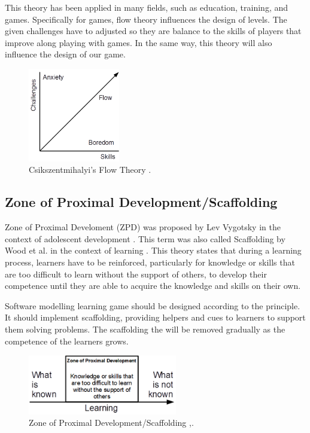 \documentclass[12pt, a4paper]{report}
\begin{document}
This theory has been applied in many fields, such as education, training, and games. Specifically for games, flow theory influences the design of levels. The given challenges have to  adjusted so they are balance to the skills of players that improve along playing with games. In the same way, this theory will also influence the design of our game. 

\begin{figure}[ht]
\centering
\includegraphics[width=4cm]{flow-theory}
\caption{Csikszentmihalyi's Flow Theory \cite{csikszentmihalyi2014toward}.}
\label{fig:flow-theory}
\end{figure}
    
\subsection{Zone of Proximal Development/Scaffolding}
Zone of Proximal Develoment (ZPD) was proposed by Lev Vygotsky in the context of adolescent development \cite{vygotsky1978mind}. This term was also called Scaffolding by Wood et al. in the context of learning \cite{wood1976role}. This theory  states that during a learning process, learners have to be reinforced, particularly for knowledge or skills that are too difficult to learn without the support of others, to develop their competence until they are able to acquire the knowledge and skills on their own. 

Software modelling learning game should be designed according to the principle. It should implement  scaffolding, providing helpers and cues to learners to support them solving problems. The scaffolding the will be removed gradually as the competence of the learners grows.   

\begin{figure}[ht]
\centering
\includegraphics[width=6.5cm]{scaffolding}
\caption{Zone of Proximal Development/Scaffolding \cite{vygotsky1978mind},\cite{wood1976role}.}
\label{fig:scaffolding}
\end{figure}
\end{document}
